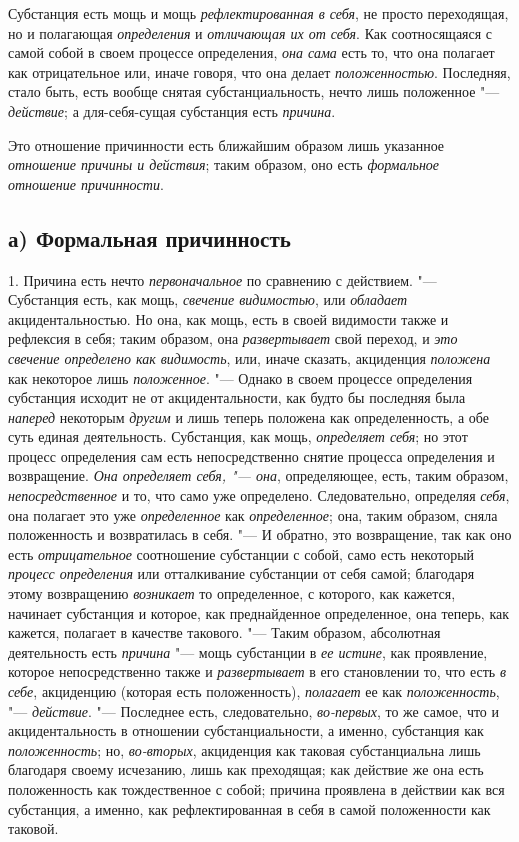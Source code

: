 Субстанция есть мощь и мощь
{\em рефлектированная в себя}, не просто переходящая,
но и полагающая {\em определения} и
{\em отличающая их от себя}. Как соотносящаяся с самой
собой в своем процессе определения, {\em она сама} есть
то, что она полагает как отрицательное или, иначе говоря, что она делает
{\em положенностью}. Последняя, стало быть, есть вообще
снятая субстанциальность, нечто лишь положенное
"--- {\em действие}; а для-себя-сущая субстанция есть
{\em причина}.

Это отношение причинности есть ближайшим образом лишь указанное
{\em отношение причины и действия}; таким образом, оно
есть {\em формальное отношение причинности}.


\subsection[а) Формальная причинность]{а) Формальная причинность}

1. Причина есть нечто
{\em первоначальное} по сравнению с действием. "---
Субстанция есть, как мощь, {\em свечение видимостью},
или {\em обладает} акцидентальностью. Но она, как мощь,
есть в своей видимости также и рефлексия в себя; таким образом, она
{\em развертывает} свой переход, и
{\em это свечение определено как видимость}, или, иначе
сказать, акциденция {\em положена} как некоторое лишь
{\em положенное}. "--- Однако в своем процессе определения
субстанция исходит не от акцидентальности, как будто бы последняя была
{\em наперед} некоторым
{\em другим} и лишь теперь положена как определенность,
а обе суть единая деятельность. Субстанция, как мощь,
{\em определяет себя}; но этот процесс определения сам
есть непосредственно снятие процесса определения и возвращение.
{\em Она определяет себя, "--- она}, определяющее, есть,
таким образом, {\em непосредственное} и то, что само
уже определено. Следовательно, определяя {\em себя},
она полагает это уже {\em определенное} как
{\em определенное}; она, таким образом, сняла
положенность и возвратилась в себя. "--- И обратно, это возвращение, так как
оно есть {\em отрицательное} соотношение субстанции с
собой, само есть некоторый {\em процесс определения}
или отталкивание субстанции от себя самой; благодаря этому возвращению
{\em возникает} то определенное, с которого, как
кажется, начинает субстанция и которое, как преднайденное определенное, она
теперь, как кажется, полагает в качестве такового. "--- Таким образом,
абсолютная деятельность есть {\em причина} "--- мощь
субстанции в {\em ее истине}, как проявление, которое
непосредственно также и {\em развертывает} в его
становлении то, что есть {\em в себе}, акциденцию
(которая есть положенность), {\em полагает} ее как {\em положенность}, "---
{\em действие}. "--- Последнее есть, следовательно,
{\em во-первых}, то же самое, что и акцидентальность в
отношении субстанциальности, а именно, субстанция как {\em положенность}; но,
{\em во-вторых}, акциденция как таковая субстанциальна
лишь благодаря своему исчезанию, лишь как преходящая; как действие же она
есть положенность как тождественное с собой; причина проявлена в действии
как вся субстанция, а именно, как рефлектированная в себя в самой
положенности как таковой.

